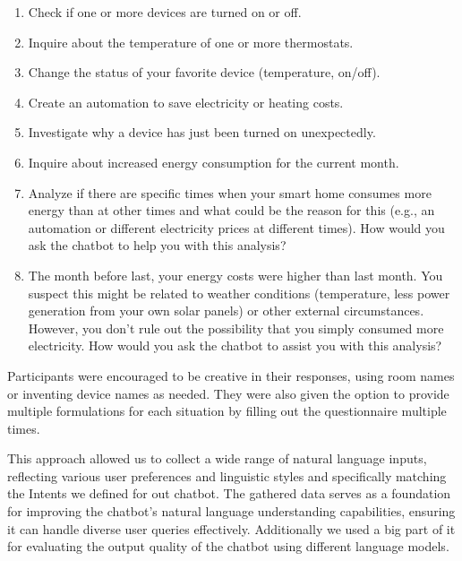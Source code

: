 \begin{enumerate}
    \item Check if one or more devices are turned on or off.
    \item Inquire about the temperature of one or more thermostats.
    \item Change the status of your favorite device (temperature, on/off).
    \item Create an automation to save electricity or heating costs.
    \item Investigate why a device has just been turned on unexpectedly.
    \item Inquire about increased energy consumption for the current month.
    \item Analyze if there are specific times when your smart home consumes more energy than at other times and what could be the reason for this (e.g., an automation or different electricity prices at different times). How would you ask the chatbot to help you with this analysis?
    \item The month before last, your energy costs were higher than last month. You suspect this might be related to weather conditions (temperature, less power generation from your own solar panels) or other external circumstances. However, you don't rule out the possibility that you simply consumed more electricity. How would you ask the chatbot to assist you with this analysis?
\end{enumerate}

Participants were encouraged to be creative in their responses, using room names or inventing device names as needed. They were also given the option to provide multiple formulations for each situation by filling out the questionnaire multiple times.

This approach allowed us to collect a wide range of natural language inputs, reflecting various user preferences and linguistic styles and specifically matching the Intents we defined for out chatbot. The gathered data serves as a foundation for improving the chatbot's natural language understanding capabilities, ensuring it can handle diverse user queries effectively.
Additionally we used a big part of it for evaluating the output quality of the chatbot using different language models.

